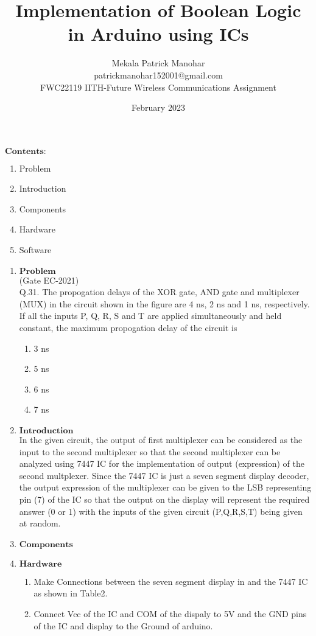 \documentclass{article}
\title{Implementation of Boolean Logic in Arduino using ICs}
\date{February 2023}
\author{Mekala Patrick Manohar\\ patrickmanohar152001@gmail.com\\ FWC22119 IITH-Future Wireless Communications Assignment}
\begin{document}
\maketitle
	$\textbf{Contents:}$
\begin{enumerate}
	\item Problem
	\item Introduction
	\item Components
	\item Hardware
	\item Software
\end{enumerate}
\begin{enumerate}
	\pagebreak \item $\textbf{Problem}$ 
		\\(Gate EC-2021)\\
Q.31. The propogation delays of the XOR gate, AND gate and multiplexer (MUX) in the circuit shown in the figure are 4 ns, 2 ns and 1 ns, respectively.\\

If all the inputs P, Q, R, S and T are applied simultaneously and held constant, the maximum propogation delay of the circuit is
\begin{enumerate}
	\item 3 ns \item 5 ns \item 6 ns \item 7 ns
\end{enumerate}
	\item $\textbf{Introduction}$ \\
		In the given circuit, the output of first multiplexer can be considered as the input to the second multiplexer so that the second multiplexer can be analyzed using 7447 IC for the implementation of output (expression) of the second multplexer. Since the 7447 IC is just a seven segment display decoder, the output expression of the multiplexer can be given to the LSB representing pin (7) of the IC so that the output on the display will represent the required answer (0 or 1) with the inputs of the given circuit (P,Q,R,S,T) being given at random.
	\item $\textbf{Components}$
		
		\item $\textbf{Hardware}$
		\begin{enumerate}
			\item Make Connections between the seven segment display in and the 7447 IC as shown in Table2.
				
			\item Connect Vcc of the IC and COM of the dispaly to 5V and the GND pins of the IC and display to the Ground of arduino.

\end{enumerate}
\end{enumerate}
\end{document}
